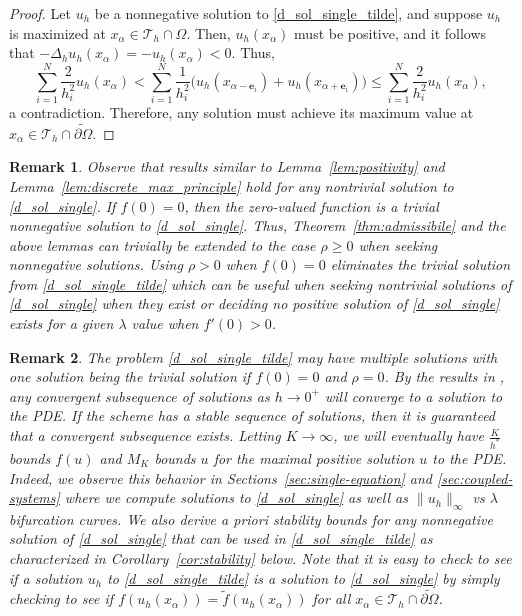 \documentclass[12pt, reqno]{amsart}
\numberwithin{equation}{section}
\newtheorem{rem}{Remark}[section]
\begin{document}
\begin{proof}
Let $u_h$ be a nonnegative solution to \eqref{d_sol_single_tilde}, and suppose $u_h$ is maximized at 
$x_\alpha \in \mathcal{T}_h \cap \Omega$.  
Then, $u_h(x_\alpha)$ must be positive, and it follows that 
$-\Delta_h u_h(x_\alpha) = - u_h(x_\alpha) < 0$.  
Thus, 
\[
    \sum_{i=1}^N \frac{2}{h_i^2} u_h(x_\alpha) 
    < \sum_{i=1}^N \frac{1}{h_i^2} \big( u_h(x_{\alpha-\mathbf{e}_i}) + u_h(x_{\alpha+\mathbf{e}_i}) \big) 
    \leq \sum_{i=1}^N \frac{2}{h_i^2} u_h(x_\alpha) , 
\]
a contradiction.  
Therefore, any solution must achieve its maximum value at $x_\alpha \in \mathcal{T}_h \cap \widetilde{\partial \Omega}$.  
\end{proof}

\begin{rem}\label{rem:rhozero}
Observe that results similar to Lemma~\ref{lem:positivity} and Lemma~\ref{lem:discrete_max_principle} hold for any nontrivial solution to \eqref{d_sol_single}. 
If $f(0) = 0$, then the zero-valued function is a trivial nonnegative solution to \eqref{d_sol_single}.  
Thus, Theorem~\ref{thm:admissibile} and the above lemmas can trivially be extended to the case $\rho \geq 0$ when seeking 
nonnegative solutions.  
Using $\rho > 0$ when $f(0) = 0$ eliminates the trivial solution from \eqref{d_sol_single_tilde} 
which can be useful when seeking nontrivial solutions of \eqref{d_sol_single} when they exist 
or deciding no positive solution of \eqref{d_sol_single} exists for a given $\lambda$ value when $f'(0) > 0$.  
\end{rem}

\begin{rem}\label{rem:implications}
The problem \eqref{d_sol_single_tilde} may have multiple solutions 
with one solution being the trivial solution if $f(0) = 0$ and $\rho = 0$.  
By the results in \cite{Lewis_Morris_Zhang_2022}, any convergent subsequence of solutions as $h \to 0^+$ will converge to a solution to the PDE.  
If the scheme has a stable sequence of solutions, then it is guaranteed that a convergent subsequence exists.  
Letting $K \to \infty$, we will eventually have 
$\frac{K}{h^*}$ bounds $f(u)$ and 
$M_K$ bounds $u$ for the maximal positive solution $u$ to the PDE.  
Indeed, we observe this behavior in Sections~\ref{sec:single-equation} and \ref{sec:coupled-systems} where we compute solutions to 
\eqref{d_sol_single} as well as $\| u_h \|_\infty$ vs $\lambda$ bifurcation curves.  
We also derive {\it a priori} stability bounds for any nonnegative solution of \eqref{d_sol_single} that can 
be used in \eqref{d_sol_single_tilde} as characterized in Corollary~\ref{cor:stability} below.  
Note that it is easy to check to see if a solution $u_h$ to \eqref{d_sol_single_tilde} 
is a solution to \eqref{d_sol_single} by simply checking to see if 
$f(u_h(x_\alpha)) = \widetilde{f}(u_h(x_\alpha))$ for all $x_\alpha \in \mathcal{T}_h \cap \widetilde{\partial \Omega}$. 
\end{rem}
\end{document}
